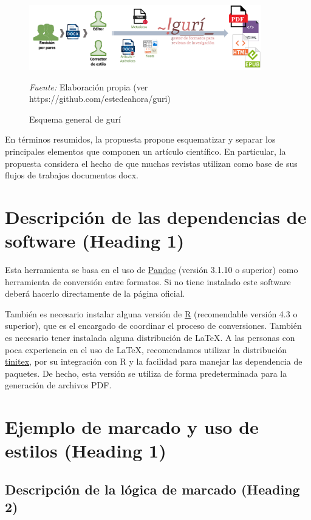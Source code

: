 \documentclass[
    a4paper,%
    DIV=calc,%
    abstract=true%
  ]{scrartcl}%
\newcommand{\source}[1]{\vspace{-9pt}\caption*{\footnotesize{\textit{Fuente:} {#1}}}}
\begin{document}
  \begin{figure}
  \centering
  \includegraphics[width=0.9\textwidth]{./float/FIG_01}
  \caption{Esquema general de gurí}
  \source{Elaboración propia (ver https://github.com/estedeahora/guri)}
  \label{FIG_01}
  \end{figure}

  En términos resumidos, la propuesta propone esquematizar y separar los
  principales elementos que componen un artículo científico. En
  particular, la propuesta considera el hecho de que muchas revistas
  utilizan como base de sus flujos de trabajos documentos docx.

  \section{Descripción de las dependencias de software (Heading
  1)}\label{descripciuxf3n-de-las-dependencias-de-software-heading-1}

  Esta herramienta se basa en el uso de
  \href{https://pandoc.org/}{Pandoc} (versión 3.1.10 o superior) como
  herramienta de conversión entre formatos. Si no tiene instalado este
  software deberá hacerlo directamente de la página oficial.

  También es necesario instalar alguna versión de
  \href{https://cran.r-project.org/}{R} (recomendable versión 4.3 o
  superior), que es el encargado de coordinar el proceso de
  conversiones. También es necesario tener instalada alguna distribución
  de LaTeX. A las personas con poca experiencia en el uso de LaTeX,
  recomendamos utilizar la distribución
  \href{https://yihui.org/tinytex/}{tinitex}, por su integración con R y
  la facilidad para manejar las dependencia de paquetes. De hecho, esta
  versión se utiliza de forma predeterminada para la generación de
  archivos PDF.

  \section{Ejemplo de marcado y uso de estilos (Heading
  1)}\label{ejemplo-de-marcado-y-uso-de-estilos-heading-1}

  \subsection{Descripción de la lógica de marcado (Heading
  2)}\label{descripciuxf3n-de-la-luxf3gica-de-marcado-heading-2}
\end{document}
